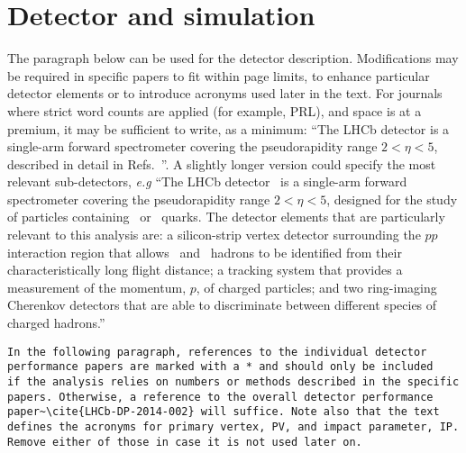 \section{Detector and simulation}
\label{sec:Detector}
The paragraph below can be used for the detector
description. Modifications may be required in specific papers to fit
within page limits, to enhance particular detector elements or to
introduce acronyms used later in the text. For journals where strict
word counts are applied (for example, PRL), and space is at a premium,
it may be sufficient to write, as a minimum: ``The LHCb detector is a 
single-arm forward spectrometer covering the pseudorapidity range 
$2 < \eta < 5$, 
described in detail in Refs.~\cite{Alves:2008zz,LHCb-DP-2014-002}''. 
A slightly longer version could specify the most relevant sub-detectors, {\it e.g} 
``The LHCb 
detector~\cite{Alves:2008zz,LHCb-DP-2014-002} is a
single-arm forward spectrometer covering the pseudorapidity range $2 < \eta < 5$, designed for
the study of particles containing \bquark\ or \cquark\ quarks. The detector elements that are particularly
relevant to this analysis are: a silicon-strip vertex detector surrounding the $pp$ interaction
region that allows \cquark\ and \bquark\ hadrons to be identified from their characteristically long
flight distance; a tracking system that provides a measurement of the momentum, $p$, of charged
particles; and two ring-imaging Cherenkov detectors that are able to discriminate between
different species of charged hadrons.'' 

\begin{verbatim}
In the following paragraph, references to the individual detector 
performance papers are marked with a * and should only be included 
if the analysis relies on numbers or methods described in the specific 
papers. Otherwise, a reference to the overall detector performance 
paper~\cite{LHCb-DP-2014-002} will suffice. Note also that the text 
defines the acronyms for primary vertex, PV, and impact parameter, IP. 
Remove either of those in case it is not used later on.
\end{verbatim}

